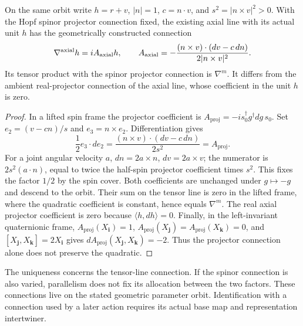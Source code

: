 \documentclass[11pt]{article}
\begin{document}
\begin{proposition}
\label{p1:prop:joint-parent-axial-connection}
On the same orbit write \(h=r+v\), \(|n|=1\),
\(c=n\cdot v\), and \(s^2=|n\times v|^2>0\).  With the Hopf spinor
projector connection fixed, the existing axial line with its actual unit
\(h\) has the geometrically constructed connection
\begin{equation}
\label{p1:eq:joint-parent-axial-connection}
 \nabla^{\rm axial}h=iA_{\rm axial}h,
 \qquad
 A_{\rm axial}
 =-\frac{(n\times v)\cdot(dv-c\,dn)}{2|n\times v|^2}.
\end{equation}
Its tensor product with the spinor projector connection is \(\nabla^m\).
It differs from the ambient real-projector connection of the axial line,
whose coefficient in the unit \(h\) is zero.
\end{proposition}

\begin{proof}
In a lifted spin frame the projector coefficient is
\(A_{\mathrm{proj}}=-is_0^\dagger g^\dagger dg\,s_0\).
Set \(e_2=(v-cn)/s\) and \(e_3=n\times e_2\).  Differentiation gives
\[
 \frac12e_3\cdot de_2
 =\frac{(n\times v)\cdot(dv-c\,dn)}{2s^2}=A_{\mathrm{proj}}.
\]
For a joint angular velocity \(a\),
\(dn=2a\times n\), \(dv=2a\times v\); the numerator is
\(2s^2(a\cdot n)\), equal to twice the half-spin projector coefficient
times \(s^2\).  This fixes the factor \(1/2\) by the spin cover.
Both coefficients are unchanged under \(g\mapsto-g\) and descend to
the orbit.  Their sum on the tensor line is zero in the lifted frame,
where the quadratic coefficient is constant, hence equals \(\nabla^m\).
The real axial projector coefficient is zero because
\(\langle h,dh\rangle=0\).  Finally, in the left-invariant quaternionic
frame, \(A_{\mathrm{proj}}(X_{\mathbf i})=1\),
\(A_{\mathrm{proj}}(X_{\mathbf j})=A_{\mathrm{proj}}(X_{\mathbf k})=0\), and
\([X_{\mathbf j},X_{\mathbf k}]=2X_{\mathbf i}\) gives
\(dA_{\mathrm{proj}}(X_{\mathbf j},X_{\mathbf k})=-2\).
Thus the projector connection alone does not preserve the quadratic.
\end{proof}

The uniqueness concerns the tensor-line connection.  If the spinor
connection is also varied, parallelism does not fix its allocation between
the two factors.  These connections live on the stated geometric parameter
orbit.  Identification with a connection used by a later action requires
its actual base map and representation intertwiner.
\end{document}
